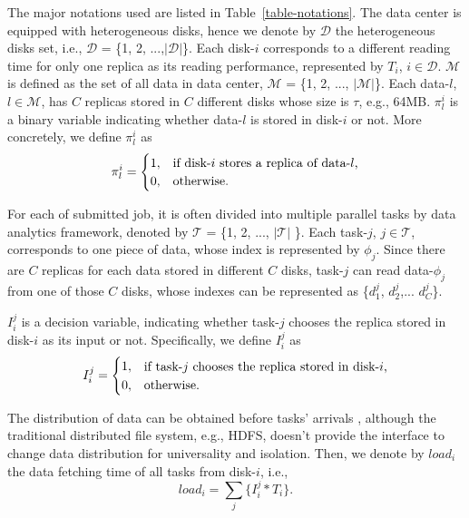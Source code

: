 \documentclass[conference]{IEEEtran}
\makeatletter
\newcommand{\tabincell}[2]{\begin{tabular}{@{}#1@{}}#2\end{tabular}}
\makeatother
\begin{document}
The major notations used are listed in Table~\ref{table-notations}. The data center is equipped with heterogeneous disks, hence we denote by $\mathcal{D}$ the heterogeneous disks set, i.e., $\mathcal{D}$ = \{1, 2, ...,$|\mathcal{D}|$\}. Each disk-$i$ corresponds to a different reading time for only one replica as its reading performance, represented by $T_i$, $i \in \mathcal{D}$.
$\mathcal{M}$ is defined as the set of all data in data center, $\mathcal{M}$ = \{1, 2, ..., $|\mathcal{M}|$\}. Each data-$l$, $l\in\mathcal{M}$, has $C$ replicas stored in $C$ different disks whose size is $\tau$, e.g., 64MB. $\pi_l^{i}$ is a binary variable indicating whether data-$l$ is stored in disk-$i$ or not. More concretely, we define $\pi_l^{i}$ as
\vspace{-0.1cm}
\begin{equation}
\pi_l^{i} =
\begin{cases}
1, &\text{if disk-$i$ stores a replica of data-$l$,}\\
0, &\text{otherwise.}
\end{cases}\nonumber
\vspace{-0.1cm}
\end{equation}

For each of submitted job, it is often divided into multiple parallel tasks by data analytics framework, denoted by $\mathcal{T}$ = \{1, 2,  ..., $\mathcal{|T|}$ \}. Each task-$j$, $j\in\mathcal{T}$, corresponds to one piece of data, whose index is represented by $\phi_j$. 
Since there are $C$ replicas for each data stored in different $C$ disks, task-$j$ can read data-$\phi_j$ from one of those $C$ disks, whose indexes can be represented as \{$d_{1}^j$, $d_{2}^j$,... $d_{C}^j$\}.


$I_i^j$ is a decision variable, indicating whether task-$j$ chooses the replica stored in disk-$i$ as its input or not. Specifically, we define $I_i^{j}$ as
\begin{equation}
I_i^j =
\begin{cases}
1, &\text{\tabincell{l}{if task-$j$ chooses the replica stored in disk-$i$,}}\\
0, &\text{otherwise.}
\end{cases}\nonumber
\end{equation}

The distribution of data can be obtained before tasks' arrivals \cite{b48}, although the traditional distributed file system, e.g., HDFS, doesn't provide the interface to change data distribution for universality and isolation.  
Then, we denote by $load_i$ the data fetching time of all tasks from disk-$i$, i.e.,
\begin{equation}
 load_{i} = \sum_{j}\{I_i^j*T_i\}. \nonumber
\end{equation}
 
\end{document}

